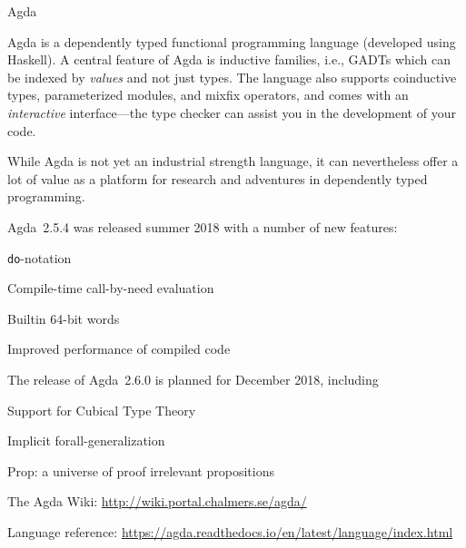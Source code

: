 \begin{hcarentry}[updated]{Agda}
\label{agda}
\makeheader

Agda is a dependently typed functional programming language (developed
using Haskell). A central feature of Agda is inductive families,
i.e., GADTs which can be indexed by \emph{values} and not just types.
The language also supports coinductive types, parameterized modules,
and mixfix operators, and comes with an \emph{interactive}
interface---the type checker can assist you in the development of your
code.

While Agda is not yet an industrial strength language, it can nevertheless
offer a lot of value as a platform for research and adventures in
dependently typed programming.

Agda~2.5.4 was released summer 2018 with a number of new features:
\begin{compactitem}
\item {\tt do}-notation
\item Compile-time call-by-need evaluation
\item Builtin 64-bit words
\item Improved performance of compiled code
\end{compactitem}

The release of Agda~2.6.0 is planned for December 2018, including
\begin{compactitem}
\item Support for Cubical Type Theory
\item Implicit forall-generalization
\item Prop: a universe of proof irrelevant propositions
\end{compactitem}

\FurtherReading
\begin{compactitem}
\item The Agda Wiki: \url{http://wiki.portal.chalmers.se/agda/}
\item Language reference: \url{https://agda.readthedocs.io/en/latest/language/index.html}
\end{compactitem}
\end{hcarentry}
